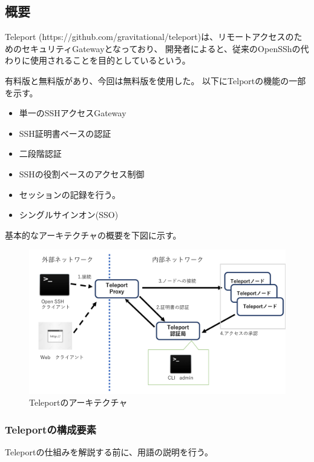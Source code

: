 \documentclass[11pt,a4j,titlepage]{jreport}
\begin{document}
\subsection*{概要}
Teleport (https://github.com/gravitational/teleport)は、リモートアクセスのためのセキュリティGatewayとなっており、
開発者によると、従来のOpenSShの代わりに使用されることを目的としているという。

有料版と無料版があり、今回は無料版を使用した。
以下にTelportの機能の一部を示す。

\begin{itemize}
    \setlength{\parskip}{0.1cm} %
    \setlength{\itemsep}{0.1cm}
    \item 単一のSSHアクセスGateway
    \item SSH証明書ベースの認証
    \item 二段階認証
    \item SSHの役割ベースのアクセス制御
    \item セッションの記録を行う。
    \item シングルサインオン(SSO)
\end{itemize}

基本的なアーキテクチャの概要を下図に示す。
\begin{figure}[H]
    \centering
    \includegraphics*[width=1.0\textwidth,page=1]{graphs/teleport_archtecture.pdf}
    \caption{Teleportのアーキテクチャ}
    \label{teleport_archtecture}
\end{figure}


\subsubsection*{Teleportの構成要素}
Teleportの仕組みを解説する前に、用語の説明を行う。
\end{document}
